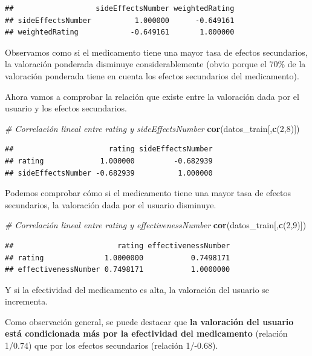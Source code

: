 \documentclass[spanish,]{article}
\newenvironment{Shaded}{\begin{snugshade}}{\end{snugshade}}
\newcommand{\KeywordTok}[1]{\textcolor[rgb]{0.13,0.29,0.53}{\textbf{#1}}}
\newcommand{\DecValTok}[1]{\textcolor[rgb]{0.00,0.00,0.81}{#1}}
\newcommand{\CommentTok}[1]{\textcolor[rgb]{0.56,0.35,0.01}{\textit{#1}}}
\newcommand{\NormalTok}[1]{#1}
\begin{document}
\begin{verbatim}
##                   sideEffectsNumber weightedRating
## sideEffectsNumber          1.000000      -0.649161
## weightedRating            -0.649161       1.000000
\end{verbatim}

Observamos como si el medicamento tiene una mayor tasa de efectos
secundarios, la valoración ponderada disminuye considerablemente (obvio
porque el 70\% de la valoración ponderada tiene en cuenta los efectos
secundarios del medicamento).

Ahora vamos a comprobar la relación que existe entre la valoración dada
por el usuario y los efectos secundarios.

\begin{Shaded}
\begin{Highlighting}[]
\CommentTok{# Correlación lineal entre rating y sideEffectsNumber}
\KeywordTok{cor}\NormalTok{(datos_train[,}\KeywordTok{c}\NormalTok{(}\DecValTok{2}\NormalTok{,}\DecValTok{8}\NormalTok{)])}
\end{Highlighting}
\end{Shaded}

\begin{verbatim}
##                      rating sideEffectsNumber
## rating             1.000000         -0.682939
## sideEffectsNumber -0.682939          1.000000
\end{verbatim}

Podemos comprobar cómo si el medicamento tiene una mayor tasa de efectos
secundarios, la valoración dada por el usuario disminuye.

\begin{Shaded}
\begin{Highlighting}[]
\CommentTok{# Correlación lineal entre rating y effectivenessNumber}
\KeywordTok{cor}\NormalTok{(datos_train[,}\KeywordTok{c}\NormalTok{(}\DecValTok{2}\NormalTok{,}\DecValTok{9}\NormalTok{)])}
\end{Highlighting}
\end{Shaded}

\begin{verbatim}
##                        rating effectivenessNumber
## rating              1.0000000           0.7498171
## effectivenessNumber 0.7498171           1.0000000
\end{verbatim}

Y si la efectividad del medicamento es alta, la valoración del usuario
se incrementa.

Como observación general, se puede destacar que \textbf{la valoración
del usuario está condicionada más por la efectividad del medicamento}
(relación 1/0.74) que por los efectos secundarios (relación 1/-0.68).
\end{document}
